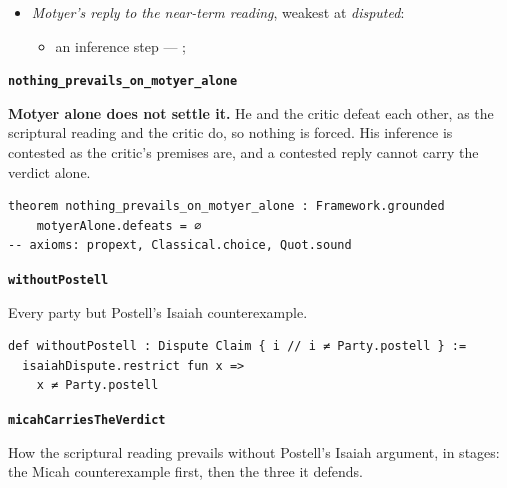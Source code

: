\documentclass[11pt]{article}
\begin{document}
\begin{itemize}
\begin{itemize}
\item an inference step --- \cite[ad loc. Isa 7:14]{motyer-isaiah-1993}
\item an inference step --- \cite[9--10]{miravalle-meet-mary-2007}
\item an inference step --- \cite[490--493]{postell-isaiah-messianic-2025}
\item an inference step --- \cite[ad loc. Matt 1:23]{france-matthew-2007}
\end{itemize}
\item \emph{Motyer's reply to the near-term reading}, weakest at \emph{disputed}:
\begin{itemize}
\item an inference step --- \cite[124]{motyer-context-content-1970}; \cite[5]{compton-immanuel-prophecy-2007}
\end{itemize}
\end{itemize}
\par\medskip\noindent\textbf{\texttt{nothing\_\allowbreak{}prevails\_\allowbreak{}on\_\allowbreak{}motyer\_\allowbreak{}alone}}\par\nobreak\noindent
\textbf{Motyer alone does not settle it.} He and the critic defeat each other, as the scriptural reading and the critic do, so nothing is forced. His inference is contested as the critic's premises are, and a contested reply cannot carry the verdict alone.

{\small\begin{verbatim}
theorem nothing_prevails_on_motyer_alone : Framework.grounded
    motyerAlone.defeats = ∅
-- axioms: propext, Classical.choice, Quot.sound
\end{verbatim}}
\par\medskip\noindent\textbf{\texttt{without\allowbreak{}Postell}}\par\nobreak\noindent
Every party but Postell's Isaiah counterexample.

{\small\begin{verbatim}
def withoutPostell : Dispute Claim { i // i ≠ Party.postell } :=
  isaiahDispute.restrict fun x =>
    x ≠ Party.postell
\end{verbatim}}
\par\medskip\noindent\textbf{\texttt{micah\allowbreak{}Carries\allowbreak{}The\allowbreak{}Verdict}}\par\nobreak\noindent
How the scriptural reading prevails without Postell's Isaiah argument, in stages: the Micah counterexample first, then the three it defends.
\end{document}
